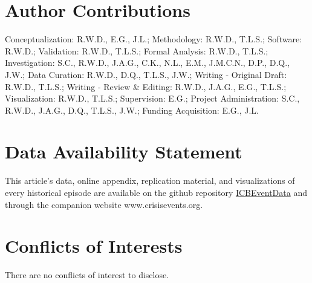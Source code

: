 \documentclass{article}
\begin{document}
\hypertarget{format}{%
\section*{Author Contributions}\label{format}}

Conceptualization: R.W.D., E.G., J.L.; Methodology: R.W.D., T.L.S.;
Software: R.W.D.; Validation: R.W.D., T.L.S.; Formal Analysis: R.W.D.,
T.L.S.; Investigation: S.C., R.W.D., J.A.G., C.K., N.L., E.M., J.M.C.N.,
D.P., D.Q., J.W.; Data Curation: R.W.D., D.Q., T.L.S., J.W.; Writing -
Original Draft: R.W.D., T.L.S.; Writing - Review \& Editing: R.W.D.,
J.A.G., E.G., T.L.S.; Visualization: R.W.D., T.L.S.; Supervision: E.G.;
Project Administration: S.C., R.W.D., J.A.G., D.Q., T.L.S., J.W.;
Funding Acquisition: E.G., J.L.

\hypertarget{format}{%
\section*{Data Availability Statement}\label{format}}

This article's data, online appendix, replication material, and
visualizations of every historical episode are available on the github
repository
\href{https://urldefense.com/v3/__https://github.com/CenterForPeaceAndSecurityStudies/ICBEventData__;!!Mih3wA!WxDJtEczKfxGTh0S2Krunap8ReymFEL5iTWaSfOHeqlSdyfRx77zmjBSWO1OAm13$}{ICBEventData}
and through the companion website www.crisisevents.org.

\hypertarget{format}{%
\section*{Conflicts of Interests}\label{format}}

There are no conflicts of interest to disclose.

~
\end{document}

